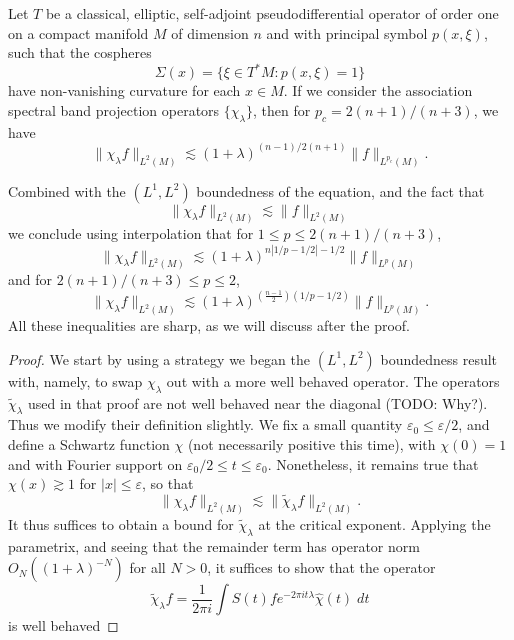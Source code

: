 \begin{theorem}
    Let $T$ be a classical, elliptic, self-adjoint pseudodifferential operator of order one on a compact manifold $M$ of dimension $n$ and with principal symbol $p(x,\xi)$, such that the cospheres
    \[ \Sigma(x) = \{ \xi \in T^*M : p(x,\xi) = 1 \} \]
    have non-vanishing curvature for each $x \in M$. If we consider the association spectral band projection operators $\{ \chi_\lambda \}$, then for $p_c = 2(n+1)/(n+3)$, we have
    \[ \| \chi_\lambda f \|_{L^2(M)} \lesssim (1 + \lambda)^{(n - 1)/2(n+1)} \| f \|_{L^{p_c}(M)}. \]
\end{theorem}

\begin{remark}
    Combined with the $(L^1,L^2)$ boundedness of the equation, and the fact that
    \[ \| \chi_\lambda f \|_{L^2(M)} \lesssim \| f \|_{L^2(M)} \]
    we conclude using interpolation that for $1 \leq p \leq 2(n+1)/(n+3)$,
    \[ \| \chi_\lambda f \|_{L^2(M)} \lesssim (1 + \lambda)^{n|1/p - 1/2| - 1/2} \| f \|_{L^p(M)} \]
    and for $2(n+1)/(n+3) \leq p \leq 2$,
    \[ \| \chi_\lambda f \|_{L^2(M)} \lesssim (1 + \lambda)^{(\frac{n-1}{2})(1/p-1/2)} \| f \|_{L^p(M)}. \]
    All these inequalities are sharp, as we will discuss after the proof.
\end{remark}

\begin{proof}
    We start by using a strategy we began the $(L^1,L^2)$ boundedness result with, namely, to swap $\chi_\lambda$ out with a more well behaved operator. The operators $\tilde{\chi}_\lambda$ used in that proof are not well behaved near the diagonal (TODO: Why?). Thus we modify their definition slightly. We fix a small quantity $\varepsilon_0 \leq \varepsilon/2$, and define a Schwartz function $\chi$ (not necessarily positive this time), with $\chi(0) = 1$ and with Fourier support on $\varepsilon_0 / 2 \leq t \leq \varepsilon_0$. Nonetheless, it remains true that $\chi(x) \gtrsim 1$ for $|x| \leq \varepsilon$, so that
    \[ \| \chi_\lambda f \|_{L^2(M)} \lesssim \| \tilde{\chi}_\lambda f \|_{L^2(M)}. \]
    It thus suffices to obtain a bound for $\tilde{\chi}_\lambda$ at the critical exponent. Applying the parametrix, and seeing that the remainder term has operator norm $O_N((1 + \lambda)^{-N})$ for all $N > 0$, it suffices to show that the operator
    \[ \tilde{\chi}_\lambda f = \frac{1}{2 \pi i} \int S(t) f e^{-2 \pi i t \lambda} \widehat{\chi}(t)\; dt \]
    is well behaved 
\end{proof}









